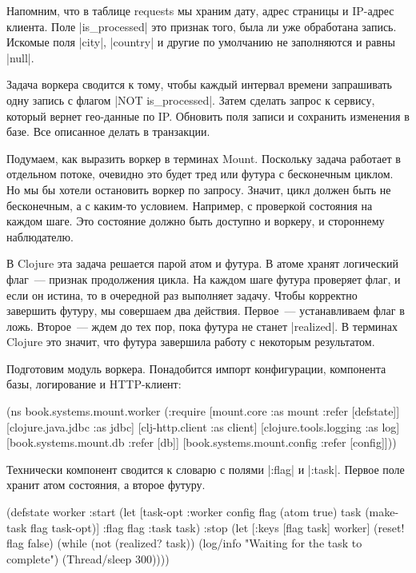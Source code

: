Напомним, что в таблице requests мы храним дату, адрес страницы и IP-адрес
клиента. Поле \spverb|is_processed| это признак того, была ли уже обработана
запись. Искомые поля \spverb|city|, \spverb|country| и другие по умолчанию не заполняются и
равны \spverb|null|.

Задача воркера сводится к тому, чтобы каждый интервал времени запрашивать одну
запись с флагом \spverb|NOT is_processed|. Затем сделать запрос к сервису, который
вернет гео-данные по IP. Обновить поля записи и сохранить изменения в базе. Все
описанное делать в транзакции.

Подумаем, как выразить воркер в терминах Mount. Поскольку задача работает в
отдельном потоке, очевидно это будет тред или футура с бесконечным циклом. Но мы
бы хотели остановить воркер по запросу. Значит, цикл должен быть не бесконечным,
а с каким-то условием. Например, с проверкой состояния на каждом шаге. Это
состояние должно быть доступно и воркеру, и стороннему наблюдателю.

В Clojure эта задача решается парой атом и футура. В атоме хранят логический
флаг~--- признак продолжения цикла. На каждом шаге футура проверяет флаг, и если
он истина, то в очередной раз выполняет задачу. Чтобы корректно завершить
футуру, мы совершаем два действия. Первое~--- устанавливаем флаг в ложь. Второе~---
ждем до тех пор, пока футура не станет \spverb|realized|. В терминах Clojure это
значит, что футура завершила работу с некоторым результатом.

Подготовим модуль воркера. Понадобится импорт конфигурации, компонента базы,
логирование и HTTP-клиент:

\begin{code}
(ns book.systems.mount.worker
  (:require
   [mount.core :as mount :refer [defstate]]
   [clojure.java.jdbc :as jdbc]
   [clj-http.client :as client]
   [clojure.tools.logging :as log]
   [book.systems.mount.db :refer [db]]
   [book.systems.mount.config :refer [config]]))
\end{code}

Технически компонент сводится к словарю с полями \spverb|:flag| и \spverb|:task|. Первое поле
хранит атом состояния, а второе футуру.

\begin{code}
(defstate worker
  :start
  (let [{task-opt :worker} config
        flag (atom true)
        task (make-task flag task-opt)]
    {:flag flag :task task})
  :stop
  (let [{:keys [flag task]} worker]
    (reset! flag false)
    (while (not (realized? task))
      (log/info "Waiting for the task to complete")
      (Thread/sleep 300))))
\end{code}

